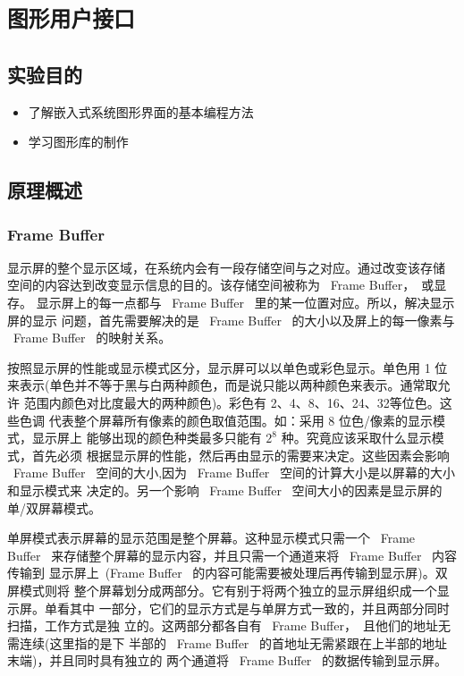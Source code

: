 \chapter{\tt 图形用户接口}
\section{实验目的}
\begin{itemize}\itemsep=-3pt
  \item 了解嵌入式系统图形界面的基本编程方法
  \item 学习图形库的制作
\end{itemize}

\section{原理概述}
\subsection{Frame Buffer}
	显示屏的整个显示区域，在系统内会有一段存储空间与之对应。通过改变该存储
空间的内容达到改变显示信息的目的。该存储空间被称为 ~Frame Buffer，~或显存。
显示屏上的每一点都与 ~Frame Buffer~ 里的某一位置对应。所以，解决显示屏的显示
问题，首先需要解决的是 ~Frame Buffer~ 的大小以及屏上的每一像素与 ~Frame
Buffer~ 的映射关系。

	按照显示屏的性能或显示模式区分，显示屏可以以单色或彩色显示。单色用 1 位
来表示(单色并不等于黑与白两种颜色，而是说只能以两种颜色来表示。通常取允许
范围内颜色对比度最大的两种颜色)。彩色有 2、4、8、16、24、32等位色。这些色调
代表整个屏幕所有像素的颜色取值范围。如：采用 8 位色/像素的显示模式，显示屏上
能够出现的颜色种类最多只能有 $2^8$ 种。究竟应该采取什么显示模式，首先必须
根据显示屏的性能，然后再由显示的需要来决定。这些因素会影响 ~Frame Buffer~
空间的大小,因为 ~Frame Buffer~ 空间的计算大小是以屏幕的大小和显示模式来
决定的。另一个影响 ~Frame Buffer~ 空间大小的因素是显示屏的单/双屏幕模式。

	单屏模式表示屏幕的显示范围是整个屏幕。这种显示模式只需一个 ~Frame Buffer~
来存储整个屏幕的显示内容，并且只需一个通道来将 ~Frame Buffer~ 内容传输到
显示屏上~(Frame Buffer~ 的内容可能需要被处理后再传输到显示屏)。双屏模式则将
整个屏幕划分成两部分。它有别于将两个独立的显示屏组织成一个显示屏。单看其中
一部分，它们的显示方式是与单屏方式一致的，并且两部分同时扫描，工作方式是独
立的。这两部分都各自有 ~Frame Buffer，~且他们的地址无需连续(这里指的是下
半部的 ~Frame Buffer~ 的首地址无需紧跟在上半部的地址末端)，并且同时具有独立的
两个通道将 ~Frame Buffer~ 的数据传输到显示屏。

